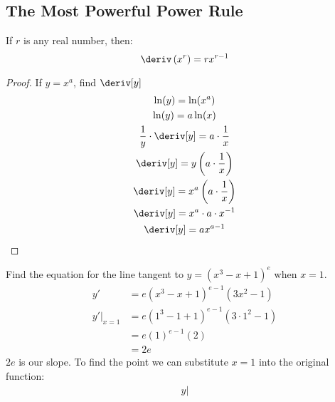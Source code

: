 \subsection{The Most Powerful Power Rule}
\begin{theorem}
    If $r$ is any real number, then:
    \begin{equation}
        \deriv\left(x^r\right) = rx^{r - 1}
    \end{equation}
\end{theorem}
\begin{proof}
    If $y = x^a$, find $\deriv[y]$
    \begin{gather*}
        \ln(y) = \ln(x^a) \\
        \ln(y) = a\ln(x) \\
        \dfrac{1}{y} \cdot \deriv[y] = a \cdot \dfrac{1}{x} \\
        \deriv[y] = y\left(a \cdot \dfrac{1}{x}\right) \\
        \deriv[y] = x^a \left(a \cdot \dfrac{1}{x}\right) \\
        \deriv[y] = x^a \cdot a \cdot x^{-1} \\
        \deriv[y] = a x^{a - 1}
    \end{gather*}
\end{proof}
\begin{example}
    Find the equation for the line tangent to $y = \left(x^3 - x + 1\right)^e$ when $x = 1$.
    \begin{align*}
        y' &= e\left(x^3 - x + 1\right)^{e - 1}\left(3x^2 - 1\right) \\
        \left.y'\right|_{x = 1} &= e\left(1^3 - 1 + 1\right)^{e - 1}\left(3 \cdot 1^2 - 1\right) \\
                                &= e\left(1\right)^{e - 1}\left(2\right) \\
                                &= 2e
    \end{align*}
    $2e$ is our slope. To find the point we can substitute $x = 1$ into the original function:
    \begin{align*}
        \left.y\right|
    \end{align*}
\end{example}

